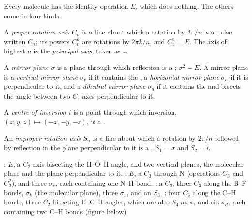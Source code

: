 Every molecule has the identity operation $E$, which does nothing. The
others come in four kinds.

\begin{definition}\label{def:b3:point-groups:rotation}
A \emph{proper rotation axis} $C_n$ is a line
about which a rotation by $2\pi/n$ is a , also written
$C_n$; its powers $C_n^k$ are rotations by $2\pi k/n$, and $C_n^n = E$. The
axis of highest $n$ is the \emph{principal axis}, taken
as $z$.
\end{definition}

\begin{definition}\label{def:b3:point-groups:mirror}
A \emph{mirror plane} $\sigma$ is a plane through which
reflection is a ; $\sigma^2 = E$. A mirror plane is a
\emph{vertical mirror plane} $\sigma_v$ if it
contains the , a \emph{horizontal mirror
plane} $\sigma_h$ if it is perpendicular to
it, and a \emph{dihedral mirror plane}
$\sigma_d$ if it contains the  and bisects the angle between
two $C_2$ axes perpendicular to it.
\end{definition}

\begin{definition}\label{def:b3:point-groups:inversion}
A \emph{centre of inversion} $i$ is a point
through which inversion, $(x, y, z) \mapsto (-x, -y, -z)$, is a .
\end{definition}

\begin{definition}\label{def:b3:point-groups:improper}
An \emph{improper rotation axis} $S_n$ is a
line about which a rotation by $2\pi/n$ followed by reflection in the plane
perpendicular to it is a . $S_1 = \sigma$ and $S_2 = i$.
\end{definition}

\begin{example}\label{ex:b3:point-groups:elements}
: $E$, a $C_2$ axis bisecting the H--O--H angle, and two vertical
planes, the molecular plane and the plane perpendicular to it. :
$E$, a $C_3$ through N (operations $C_3$ and $C_3^2$), and three $\sigma_v$, each
containing one N--H bond. : a $C_3$, three $C_2$ along the B--F bonds,
$\sigma_h$ (the molecular plane), three $\sigma_v$, and an $S_3$. : four
$C_3$ along the C--H bonds, three $C_2$ bisecting H--C--H angles, which are
also $S_4$ axes, and six $\sigma_d$, each containing two C--H bonds
(figure below).
\end{example}

